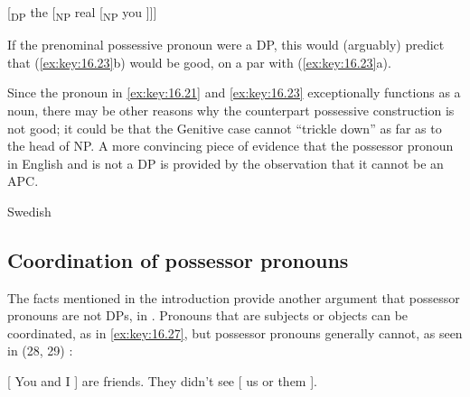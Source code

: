 \documentclass[output=paper]{langsci/langscibook}
\begin{document}
\ea\label{ex:key:16.24}
    {}[\textsubscript{DP} the [\textsubscript{NP} real [\textsubscript{NP} you ]]]
\z

If the prenominal possessive pronoun were a DP, this would (arguably) predict
that (\ref{ex:key:16.23}b) would be good, on a par with (\ref{ex:key:16.23}a).

Since the pronoun in \eqref{ex:key:16.21} and \eqref{ex:key:16.23}
exceptionally functions as a noun, there may be other reasons why the
counterpart possessive construction is not good; it could be that the
Genitive case cannot \enquote{trickle down} as far as to the
head of NP. A more convincing piece of evidence that the possessor pronoun in
English and  is not a DP is provided by the observation that it cannot
be an APC.

\ea Swedish\\\label{ex:key:16.25}
\z

\label{ex:key:16.26}
\z

\subsection{Coordination of possessor pronouns}\label{sec:key:16.3.2}

The   facts mentioned in the introduction provide another
argument that possessor pronouns are not DPs, in . Pronouns that are
subjects or objects can be coordinated, as in \eqref{ex:key:16.27}, but possessor pronouns
generally cannot, as seen in (28, 29) \parencite[601--602]{QuirkEtAl1972}:

\ea\label{ex:key:16.27}
    {}[ You and I ] are friends. They didn’t see [ us or them ].
\z

\ea\label{ex:key:16.28}
	\z
\z

\ea\label{ex:key:16.29}
	\z
\z\largerpage[-4]
\end{document}
